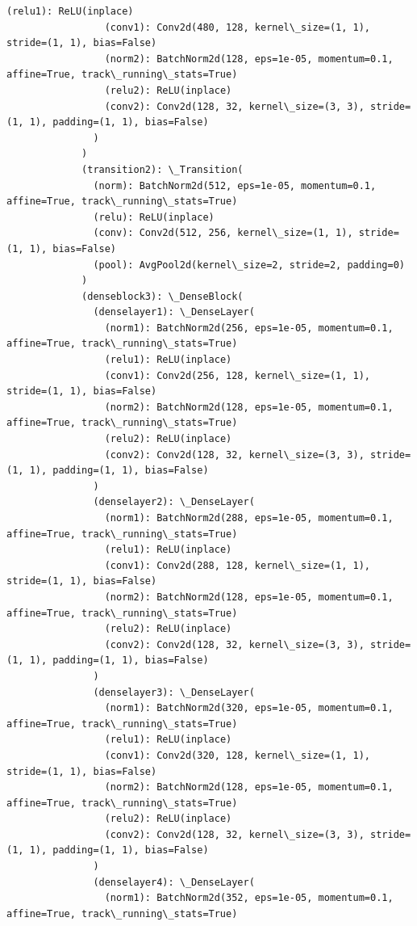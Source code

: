 \documentclass[11pt]{article}
\begin{document}
\begin{Verbatim}[commandchars=\\\{\}]
                 (relu1): ReLU(inplace)
                 (conv1): Conv2d(480, 128, kernel\_size=(1, 1), stride=(1, 1), bias=False)
                 (norm2): BatchNorm2d(128, eps=1e-05, momentum=0.1, affine=True, track\_running\_stats=True)
                 (relu2): ReLU(inplace)
                 (conv2): Conv2d(128, 32, kernel\_size=(3, 3), stride=(1, 1), padding=(1, 1), bias=False)
               )
             )
             (transition2): \_Transition(
               (norm): BatchNorm2d(512, eps=1e-05, momentum=0.1, affine=True, track\_running\_stats=True)
               (relu): ReLU(inplace)
               (conv): Conv2d(512, 256, kernel\_size=(1, 1), stride=(1, 1), bias=False)
               (pool): AvgPool2d(kernel\_size=2, stride=2, padding=0)
             )
             (denseblock3): \_DenseBlock(
               (denselayer1): \_DenseLayer(
                 (norm1): BatchNorm2d(256, eps=1e-05, momentum=0.1, affine=True, track\_running\_stats=True)
                 (relu1): ReLU(inplace)
                 (conv1): Conv2d(256, 128, kernel\_size=(1, 1), stride=(1, 1), bias=False)
                 (norm2): BatchNorm2d(128, eps=1e-05, momentum=0.1, affine=True, track\_running\_stats=True)
                 (relu2): ReLU(inplace)
                 (conv2): Conv2d(128, 32, kernel\_size=(3, 3), stride=(1, 1), padding=(1, 1), bias=False)
               )
               (denselayer2): \_DenseLayer(
                 (norm1): BatchNorm2d(288, eps=1e-05, momentum=0.1, affine=True, track\_running\_stats=True)
                 (relu1): ReLU(inplace)
                 (conv1): Conv2d(288, 128, kernel\_size=(1, 1), stride=(1, 1), bias=False)
                 (norm2): BatchNorm2d(128, eps=1e-05, momentum=0.1, affine=True, track\_running\_stats=True)
                 (relu2): ReLU(inplace)
                 (conv2): Conv2d(128, 32, kernel\_size=(3, 3), stride=(1, 1), padding=(1, 1), bias=False)
               )
               (denselayer3): \_DenseLayer(
                 (norm1): BatchNorm2d(320, eps=1e-05, momentum=0.1, affine=True, track\_running\_stats=True)
                 (relu1): ReLU(inplace)
                 (conv1): Conv2d(320, 128, kernel\_size=(1, 1), stride=(1, 1), bias=False)
                 (norm2): BatchNorm2d(128, eps=1e-05, momentum=0.1, affine=True, track\_running\_stats=True)
                 (relu2): ReLU(inplace)
                 (conv2): Conv2d(128, 32, kernel\_size=(3, 3), stride=(1, 1), padding=(1, 1), bias=False)
               )
               (denselayer4): \_DenseLayer(
                 (norm1): BatchNorm2d(352, eps=1e-05, momentum=0.1, affine=True, track\_running\_stats=True)

\end{Verbatim}
\end{document}
